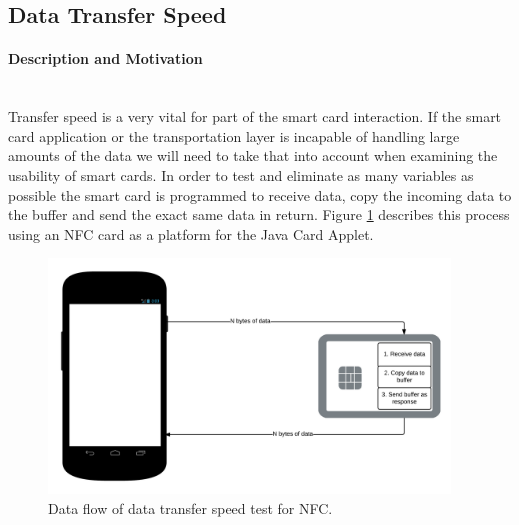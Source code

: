 \subsection{Data Transfer Speed}
\paragraph{Description and Motivation}\mbox{}\\
Transfer speed is a very vital for part of the smart card interaction. If the smart card application or the transportation layer is incapable of handling large amounts of the data we will need to take that into account when examining the usability of smart cards. In order to test and eliminate as many variables as possible the smart card is programmed to receive data, copy the incoming data to the buffer and send the exact same data in return. Figure \ref{fig:nfcDataflowTest} describes this process using an NFC card as a platform for the Java Card Applet.

\begin{figure}[h!]
  \caption{Data flow of data transfer speed test for NFC.}
  \label{fig:nfcDataflowTest}
  \centering
    \includegraphics[width=0.95\textwidth]{images/NFCTransferTest.png}
\end{figure}

